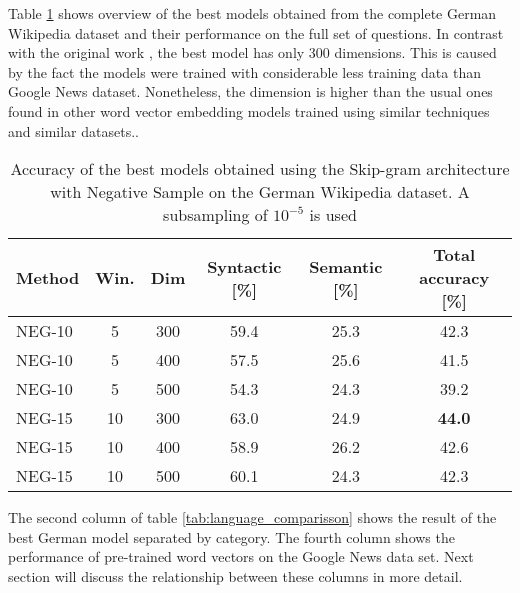 Table \ref{tab:main_results} shows  overview of the best models obtained from
the complete German Wikipedia dataset  and their performance on the full set
of questions. In contrast with the original work
\cite{MikolovSCCD13,DBLP:journals/corr/abs-1301-3781}, the best model
has only 300 dimensions. This is caused by the fact the models were trained
with considerable less training data than Google News dataset. Nonetheless,
the dimension is higher than the usual ones found in other word vector embedding models
trained using similar techniques and similar datasets.\cite{Turian:2010:WRS:1858681.1858721,DBLP:journals/corr/abs-1103-0398}.

\begin{table}[h]
\centering

\caption{Accuracy of the best models obtained using the Skip-gram
  architecture with Negative Sample on the German Wikipedia dataset. A
  subsampling of $10^{-5}$ is used} 
\label{tab:main_results}




\small
\begin{tabular}{|l|c|c|cc|c|}
\hline
Method  &  Win.  &  Dim   &  Syntactic [\%] & Semantic
[\%] &  Total accuracy [\%]  \\
\hline

NEG-10  &   5  &  300  &  59.4  &  25.3  &  42.3  \\
 NEG-10  &   5  &  400  &  57.5  &  25.6  &  41.5  \\
 NEG-10  &   5  &  500  &  54.3  &  24.3  &  39.2  \\
 NEG-15  &  10  &  300  &  63.0  &  24.9  &  \textbf{44.0}  \\
 NEG-15  &  10  &  400  &  58.9  &  26.2  &  42.6  \\
 NEG-15  &  10  &  500  &  60.1  &  24.3  &  42.3  \\
\hline
\end{tabular}
\end{table}

The second column of table \ref{tab:language_comparisson} shows the result of
the best German model separated by category. The fourth column
shows the performance of pre-trained word vectors on the Google News data
set. Next section will discuss the relationship between these columns in more detail.

